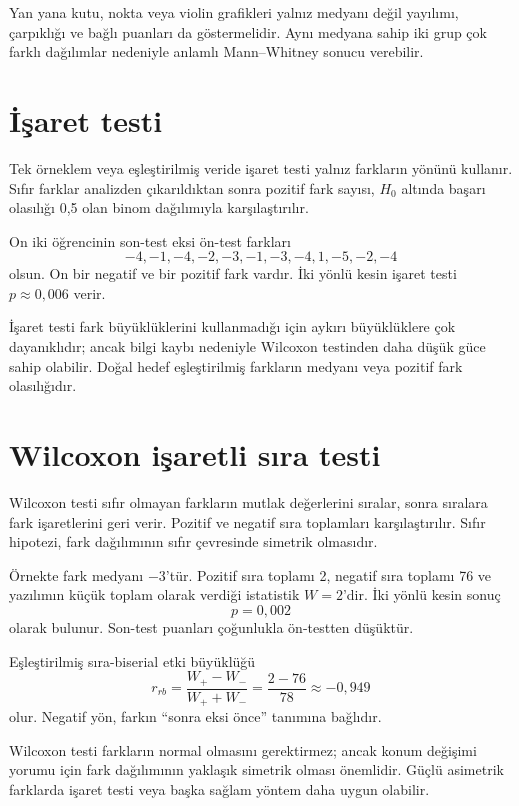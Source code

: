 Yan yana kutu, nokta veya violin grafikleri yalnız medyanı değil yayılımı,
çarpıklığı ve bağlı puanları da göstermelidir. Aynı medyana sahip iki grup çok
farklı dağılımlar nedeniyle anlamlı Mann--Whitney sonucu verebilir.

\section{İşaret testi}

Tek örneklem veya eşleştirilmiş veride işaret testi yalnız farkların yönünü
kullanır. Sıfır farklar analizden çıkarıldıktan sonra pozitif fark sayısı,
$H_0$ altında başarı olasılığı 0,5 olan binom dağılımıyla karşılaştırılır.

On iki öğrencinin son-test eksi ön-test farkları
\[
-4,-1,-4,-2,-3,-1,-3,-4,1,-5,-2,-4
\]
olsun. On bir negatif ve bir pozitif fark vardır. İki yönlü kesin işaret testi
$p\approx0{,}006$ verir.

İşaret testi fark büyüklüklerini kullanmadığı için aykırı büyüklüklere çok
dayanıklıdır; ancak bilgi kaybı nedeniyle Wilcoxon testinden daha düşük güce
sahip olabilir. Doğal hedef eşleştirilmiş farkların medyanı veya pozitif fark
olasılığıdır.

\section{Wilcoxon işaretli sıra testi}

Wilcoxon testi sıfır olmayan farkların mutlak değerlerini sıralar, sonra
sıralara fark işaretlerini geri verir. Pozitif ve negatif sıra toplamları
karşılaştırılır. Sıfır hipotezi, fark dağılımının sıfır çevresinde simetrik
olmasıdır.

Örnekte fark medyanı $-3$'tür. Pozitif sıra toplamı 2, negatif sıra toplamı
76 ve yazılımın küçük toplam olarak verdiği istatistik $W=2$'dir. İki yönlü
kesin sonuç
\[
p=0{,}002
\]
olarak bulunur. Son-test puanları çoğunlukla ön-testten düşüktür.

Eşleştirilmiş sıra-biserial etki büyüklüğü
\[
r_{rb}=\frac{W_+-W_-}{W_++W_-}
=\frac{2-76}{78}\approx-0{,}949
\]
olur. Negatif yön, farkın ``sonra eksi önce'' tanımına bağlıdır.

\begin{mistakebox}
Wilcoxon testi farkların normal olmasını gerektirmez; ancak konum değişimi
yorumu için fark dağılımının yaklaşık simetrik olması önemlidir. Güçlü
asimetrik farklarda işaret testi veya başka sağlam yöntem daha uygun olabilir.
\end{mistakebox}

